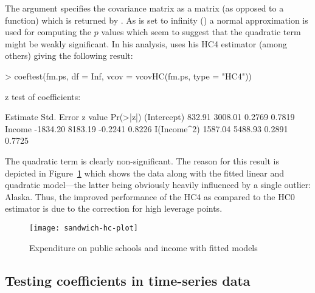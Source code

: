 \documentclass{Z}
\begin{document}
The  argument specifies the covariance matrix as a matrix
(as opposed to a function) which is returned by .
As  is set to infinity () a normal approximation is used
for computing the $p$ values which seem to suggest that the quadratic term
might be weakly significant. In his analysis, \cite{hac:Cribari-Neto:2004} uses his HC4 estimator
(among others) giving the following result:
\begin{Schunk}
\begin{Sinput}
> coeftest(fm.ps, df = Inf, vcov = vcovHC(fm.ps, type = "HC4"))
\end{Sinput}
\begin{Soutput}
z test of coefficients:

            Estimate Std. Error z value Pr(>|z|)
(Intercept)   832.91    3008.01  0.2769   0.7819
Income      -1834.20    8183.19 -0.2241   0.8226
I(Income^2)  1587.04    5488.93  0.2891   0.7725
\end{Soutput}
\end{Schunk}
The quadratic term is clearly non-significant. The reason for this result is
depicted in Figure~\ref{fig:hc} which shows the data along with the fitted linear
and quadratic model---the latter being obviously heavily influenced by a single outlier: 
Alaska. Thus, the improved performance of the HC4 as compared to
the HC0 estimator is due to the correction for high leverage points.

\begin{figure}[tbh]
\begin{center}
\texttt{[image: sandwich-hc-plot]}
\caption{\label{fig:hc} Expenditure on public schools and income with fitted models}
\end{center}
\end{figure}


\subsection{Testing coefficients in time-series data}
\end{document}
